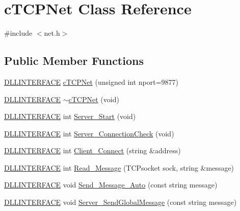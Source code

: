 \hypertarget{classc_t_c_p_net}{\section{c\-T\-C\-P\-Net Class Reference}
\label{classc_t_c_p_net}
}


{\ttfamily \#include $<$net.\-h$>$}

\subsection*{Public Member Functions}
\begin{DoxyCompactItemize}
\item 
\hyperlink{_s_d_l__ep_8h_a38dd54df4631b4daf553096353d7b20b}{D\-L\-L\-I\-N\-T\-E\-R\-F\-A\-C\-E} \hyperlink{classc_t_c_p_net_ae3b6e8bb7a7ed2e6514c5015b63f2a90}{c\-T\-C\-P\-Net} (unsigned int nport=9877)
\item 
\hyperlink{_s_d_l__ep_8h_a38dd54df4631b4daf553096353d7b20b}{D\-L\-L\-I\-N\-T\-E\-R\-F\-A\-C\-E} \hyperlink{classc_t_c_p_net_ad4216ece1502ab44f4079af281d5d1fe}{$\sim$c\-T\-C\-P\-Net} (void)
\item 
\hyperlink{_s_d_l__ep_8h_a38dd54df4631b4daf553096353d7b20b}{D\-L\-L\-I\-N\-T\-E\-R\-F\-A\-C\-E} int \hyperlink{classc_t_c_p_net_a15634492b7d8b33524891a528d43e151}{Server\-\_\-\-Start} (void)
\item 
\hyperlink{_s_d_l__ep_8h_a38dd54df4631b4daf553096353d7b20b}{D\-L\-L\-I\-N\-T\-E\-R\-F\-A\-C\-E} int \hyperlink{classc_t_c_p_net_aa3b73992250c4715f5e3f4db742a8fd0}{Server\-\_\-\-Connection\-Check} (void)
\item 
\hyperlink{_s_d_l__ep_8h_a38dd54df4631b4daf553096353d7b20b}{D\-L\-L\-I\-N\-T\-E\-R\-F\-A\-C\-E} int \hyperlink{classc_t_c_p_net_a3d31cd8ace9080710e13e6a73d6989ac}{Client\-\_\-\-Connect} (string \&address)
\item 
\hyperlink{_s_d_l__ep_8h_a38dd54df4631b4daf553096353d7b20b}{D\-L\-L\-I\-N\-T\-E\-R\-F\-A\-C\-E} int \hyperlink{classc_t_c_p_net_a2bad3284360fbba4e9bd25520c8ebe20}{Read\-\_\-\-Message} (T\-C\-Psocket sock, string \&message)
\item 
\hyperlink{_s_d_l__ep_8h_a38dd54df4631b4daf553096353d7b20b}{D\-L\-L\-I\-N\-T\-E\-R\-F\-A\-C\-E} void \hyperlink{classc_t_c_p_net_a2d6f0e395adc0b659ba66f6ebad1b4ee}{Send\-\_\-\-Message\-\_\-\-Auto} (const string message)
\item 
\hyperlink{_s_d_l__ep_8h_a38dd54df4631b4daf553096353d7b20b}{D\-L\-L\-I\-N\-T\-E\-R\-F\-A\-C\-E} void \hyperlink{classc_t_c_p_net_a8dd08049de84a7f33fcf6b1241a7ec96}{Server\-\_\-\-Send\-Global\-Message} (const string message)

\end{DoxyCompactItemize}
